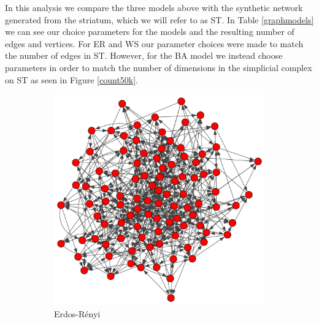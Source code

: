 In this analysis we compare the three models above with the synthetic network generated from the striatum, which we will refer to as ST. In Table \ref{graphmodels} we can see our choice parameters for the models and the resulting number of edges and vertices. For ER and WS our parameter choices were made to match the number of edges in ST. However, for the BA model we instead choose parameters in order to match the number of dimensions in the simplicial complex on ST as seen in Figure \ref{count50k}.
\begin{figure}[ht]
  \centering
  \begin{subfigure}{.33 \linewidth}
    \includegraphics[scale=0.2]{random_graphs/erdos100v500e.pdf}
    \caption{Erdos-Rényi}
  \end{subfigure}%
  \begin{subfigure}{.33 \linewidth}


\end{subfigure}
\end{figure}
